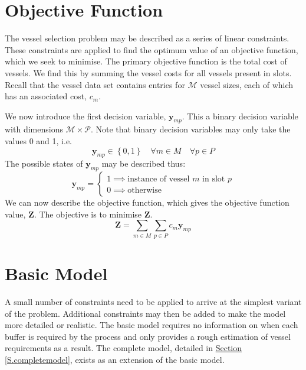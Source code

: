 \section{Objective Function}\label{S.objfn}

The vessel selection problem may be described as a series of linear
constraints.
These constraints are applied to find the optimum value of an objective
function, which we seek to minimise.
The primary objective function is the total cost of vessels.
We find this by summing the vessel costs for all vessels present in slots.
Recall that the vessel data set contains entries for $\mathcal{M}$ vessel
sizes, each of which has an associated cost, $c_{m}$.

We now introduce the first decision variable, $\boldsymbol{y}_{mp}$.
This a binary decision variable with dimensions
$\mathcal{M} \times \mathcal{P}$.
Note that binary decision variables may only take the values 0 and 1, i.e.
\begin{equation}
    \boldsymbol{y}_{mp} \in \left\{ 0, 1 \right\} \quad \forall m \in M \quad
    \forall p \in P
    \label{eq.y}
\end{equation}
The possible states of $\boldsymbol{y}_{mp}$ may be described thus:
\begin{equation}
    \boldsymbol{y}_{mp} =
    \begin{cases}
        1 \implies \text{instance of vessel $m$ in slot $p$}\\
        0 \implies \text{otherwise}
    \end{cases}
\end{equation}
We can now describe the objective function, which gives the objective function
value, $\boldsymbol{Z}$.  The objective is to minimise $\boldsymbol{Z}$.
\begin{equation}
    \boldsymbol{Z} = \sum_{m \in M} \sum_{p \in P} c_m \boldsymbol{y}_{mp}
    \label{eq.objfn}
\end{equation}

\section{Basic Model}\label{S.basicprob}

A small number of constraints need to be applied to arrive at the simplest
variant of the problem.
Additional constraints may then be added to make the model more detailed or
realistic.
The basic model requires no information on when each buffer is required by the
process and only provides a rough estimation of vessel requirements as a
result.
The complete model, detailed in
\hyperref[S.completemodel]{Section \ref*{S.completemodel}}, exists as an
extension of the basic model.

